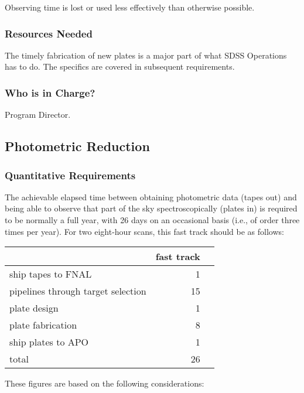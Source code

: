 Observing time is lost or used less effectively than otherwise possible.

\subsubsection{Resources Needed}

The timely fabrication of new plates is a major part of what SDSS 
Operations has to do.  The specifics are covered in subsequent 
requirements. 

\subsubsection{Who is in Charge?}

Program Director.

\subsection{Photometric Reduction}

\subsubsection{Quantitative Requirements}

The achievable elapsed time between obtaining photometric data (tapes out) 
and being able to observe that part of the sky spectroscopically (plates in) is 
required to be normally a full year, with 26 days on an occasional
basis (i.e., of order three times per year).  For two eight-hour
scans, this fast track should be as follows:

\smallskip
\begin{tabular}{lrr}
&fast track\\
\hline
ship tapes to FNAL&1\\
pipelines through target selection&15\\
plate design&1\\
plate fabrication&8\\
ship plates to APO&1\\ \hline
total&26\\
\end{tabular}

These figures are based on the following considerations:  


